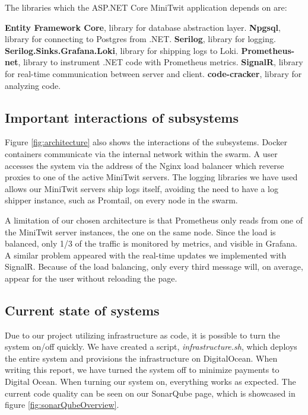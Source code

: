 \noindent The libraries which the ASP.NET Core MiniTwit application depends on are:

\begin{outline}
    \1 \textbf{Entity Framework Core}, library for database abstraction layer.
    \1 \textbf{Npgsql}, library for connecting to Postgres from .NET.
    \1 \textbf{Serilog}, library for logging.
    \1 \textbf{Serilog.Sinks.Grafana.Loki}, library for shipping logs to Loki.
    \1 \textbf{Prometheus-net}, library to instrument .NET code with Prometheus metrics.
    \1 \textbf{SignalR}, library for real-time communication between server and client.
    \1 \textbf{code-cracker}, library for analyzing code.
\end{outline}

\subsection{Important interactions of subsystems}

Figure \ref{fig:architecture} also shows the interactions of the subsystems. Docker containers communicate via the internal network within the swarm. A user accesses the system via the address of the Nginx load balancer which reverse proxies to one of the active MiniTwit servers. The logging libraries we have used allows our MiniTwit servers ship logs itself, avoiding the need to have a log shipper instance, such as Promtail, on every node in the swarm.

A limitation of our chosen architecture is that Prometheus only reads from one of the MiniTwit server instances, the one on the same node. Since the load is balanced, only 1/3 of the traffic is monitored by metrics, and visible in Grafana. A similar problem appeared with the real-time updates we implemented with SignalR. Because of the load balancing, only every third message will, on average, appear for the user without reloading the page.

\subsection{Current state of systems}
Due to our project utilizing infrastructure as code, it is possible to turn the system on/off quickly. We have created a script, \textit{infrastructure.sh}, which deploys the entire system and provisions the infrastructure on DigitalOcean. When writing this report, we have turned the system off to minimize payments to Digital Ocean. When turning our system on, everything works as expected. The current code quality can be seen on our SonarQube page, which is showcased in figure \ref{fig:sonarQubeOverview}.

